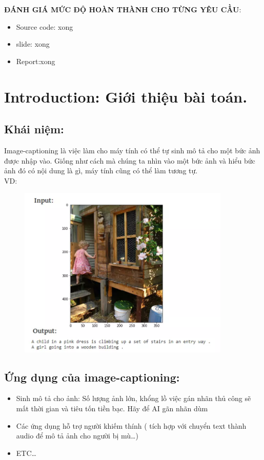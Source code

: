 \documentclass{article}
\begin{document}
\textbf{ĐÁNH GIÁ MỨC ĐỘ HOÀN THÀNH CHO TỪNG YÊU CẦU}:
\begin{itemize}
    \item Source code: xong 
    \item slide: xong
    \item Report:xong
\end{itemize}

\maketitle

\section{Introduction: Giới thiệu bài toán.}
\subsection{Khái niệm: }
Image-captioning là việc làm cho máy tính có thể tự sinh mô tả cho một bức ảnh được nhập vào. Giống như cách mà chúng ta nhìn vào một bức ảnh và hiểu bức ảnh đó có nội dung là gì, máy tính cũng có thể làm tương tự.\\
VD:
\begin{figure}[h]
  \centering
  \includegraphics[width=0.9\textwidth]{img/anh1.png}
  \label{fig:my_label}
\end{figure}
\subsection{Ứng dụng của image-captioning:}
\renewcommand{\labelenumi}{\alph{enumi}.}
\begin{itemize}
    \item Sinh mô tả cho ảnh: Số lượng ảnh lớn, khổng lồ việc gán nhãn thủ công sẽ mất thời gian và tiêu tốn tiền bạc. Hãy để AI gãn nhãn dùm
    \item Các ứng dụng hỗ trợ người khiếm thính ( tích hợp với chuyển text thành audio để mô tả ảnh cho người bị mù…)
    \item ETC…
\end{itemize}
\end{document}
